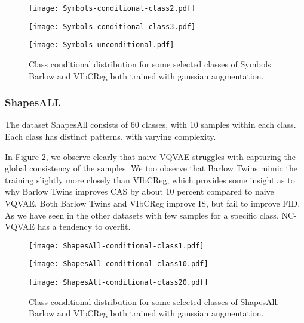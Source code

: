 \documentclass[../../thesis.tex]{subfiles}
\begin{document}
\begin{figure}[H]
    \centering
    \begin{minipage}[b]{0.32\textwidth}
        \centering
        \texttt{[image: Symbols-conditional-class2.pdf]}
    \end{minipage}
    \begin{minipage}[b]{0.32\textwidth}
        \centering
        \texttt{[image: Symbols-conditional-class3.pdf]}
    \end{minipage}
    \begin{minipage}[b]{0.32\textwidth}
        \centering
        \texttt{[image: Symbols-unconditional.pdf]}
    \end{minipage}
    \caption{Class conditional distribution for some selected classes of Symbols. Barlow and VIbCReg both trained with gaussian augmentation.}
    \label{fig:Gauss_Symbols}
\end{figure}






\subsubsection{ShapesALL}
The dataset ShapesAll consists of 60 classes, with 10 samples within each class. Each class has distinct patterns, with varying complexity.\newline

In Figure \ref{fig:Gauss_ShapesAll}, we observe clearly that naive VQVAE struggles with capturing the global consistency of the samples. We too observe that Barlow Twins mimic the training slightly more closely than VIbCReg, which provides some insight as to why Barlow Twins improves CAS by about 10 percent compared to naive VQVAE. Both Barlow Twins and VIbCReg improve IS, but fail to improve FID. As we have seen in the other datasets with few samples for a specific class, NC-VQVAE has a tendency to overfit.

\begin{figure}[H]
    \centering
    \begin{minipage}[b]{0.32\textwidth}
        \centering
        \texttt{[image: ShapesAll-conditional-class1.pdf]}
    \end{minipage}
    \begin{minipage}[b]{0.32\textwidth}
        \centering
        \texttt{[image: ShapesAll-conditional-class10.pdf]}
    \end{minipage}
    \begin{minipage}[b]{0.32\textwidth}
        \centering
        \texttt{[image: ShapesAll-conditional-class20.pdf]}
    \end{minipage}
    \caption{Class conditional distribution for some selected classes of ShapesAll. Barlow and VIbCReg both trained with gaussian augmentation.}
    \label{fig:Gauss_ShapesAll}
\end{figure}
\end{document}
